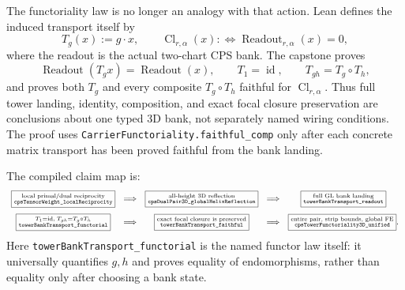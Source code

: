 \documentclass[11pt]{article}
\theoremstyle{definition}
\begin{document}
The functoriality law is no longer an analogy with that action.  Lean defines the induced transport
itself by
\[
 T_g(x):=g\cdot x,
 \qquad
 \operatorname{Cl}_{r,\alpha}(x):\Longleftrightarrow
   \operatorname{Readout}_{r,\alpha}(x)=0,
\]
where the readout is the actual two-chart CPS bank.  The capstone proves
\[
 \operatorname{Readout}(T_gx)=\operatorname{Readout}(x),\qquad
 T_1=\operatorname{id},\qquad T_{gh}=T_g\circ T_h,
\]
and proves both $T_g$ and every composite $T_g\circ T_h$ faithful for
$\operatorname{Cl}_{r,\alpha}$.  Thus full tower landing, identity, composition, and exact focal
closure preservation are conclusions about one typed 3D bank, not separately named wiring
conditions.  The proof uses \texttt{CarrierFunctoriality.faithful\_comp} only after each concrete
matrix transport has been proved faithful from the bank landing.

The compiled claim map is:
\[
\begin{array}{c@{\quad\Longrightarrow\quad}c@{\quad\Longrightarrow\quad}c}
\boxed{\substack{\text{local primal/dual reciprocity}\\
  \texttt{cpsTensorWeight\_localReciprocity}}}
&
\boxed{\substack{\text{all-height 3D reflection}\\
  \texttt{cpsDualPair3D\_globalHelixReflection}}}
&
\boxed{\substack{\text{full GL bank landing}\\
  \texttt{towerBankTransport\_readout}}}
\\[1.2em]
\boxed{\substack{T_1=\mathrm{id},\;T_{gh}=T_g\circ T_h\\
  \texttt{towerBankTransport\_functorial}}}
&
\boxed{\substack{\text{exact focal closure is preserved}\\
  \texttt{towerBankTransport\_faithful}}}
&
\boxed{\substack{\text{entire pair, strip bounds, global FE}\\
  \texttt{cpsTowerFunctoriality3D\_unified}}}.
\end{array}
\]
Here \texttt{towerBankTransport\_functorial} is the named functor law itself: it universally
quantifies $g,h$ and proves equality of endomorphisms, rather than equality only after choosing a
bank state.
\end{document}
